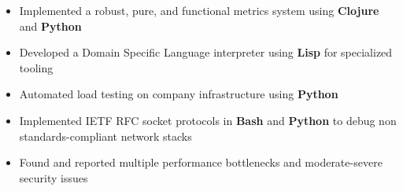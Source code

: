 \documentclass[10pt,a4paper]{altacv}
\begin{document}

\begin{fullwidth}
\makecvheader
\end{fullwidth}




\begin{itemize}
    \item Implemented a robust, pure, and functional metrics system using 
        \textbf{Clojure} and \textbf{Python}
    \item Developed a Domain Specific Language interpreter using 
        \textbf{Lisp} for specialized tooling
\end{itemize}

\divider

\begin{itemize}
    \item Automated load testing on company infrastructure using 
        \textbf{Python}
    \item Implemented IETF RFC socket protocols in \textbf{Bash} and \textbf{Python} to debug non 
        standards-compliant network stacks
    \item Found and reported multiple performance bottlenecks and 
        moderate-severe security issues
\end{itemize}
\end{document}
